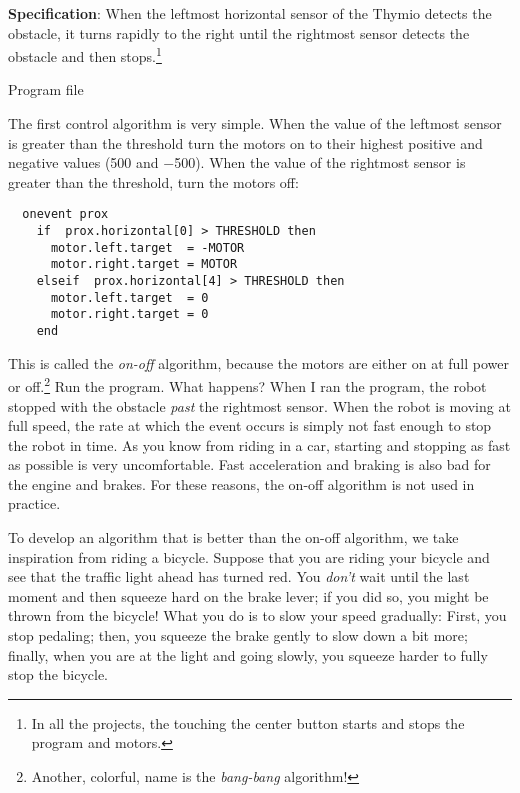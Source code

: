 
\textbf{Specification}: When the leftmost horizontal sensor of the
Thymio detects the obstacle, it turns rapidly to the right until the
rightmost sensor detects the obstacle and then stops.\footnote{In all
the projects, the touching the center button starts and stops the
program and motors.}

{\raggedleft \hfill Program file }

The first control algorithm is very simple. When the value of the
leftmost sensor is greater than the threshold turn the motors
on to their highest positive and negative values (500 and $-$500). When
the value of the rightmost sensor is greater than the threshold, turn
the motors off:

\begin{verbatim}
  onevent prox
    if  prox.horizontal[0] > THRESHOLD then
      motor.left.target  = -MOTOR 
      motor.right.target = MOTOR
    elseif  prox.horizontal[4] > THRESHOLD then
      motor.left.target  = 0
      motor.right.target = 0
    end
\end{verbatim}

This is called the \emph{on-off} algorithm, because the motors are
either on at full power or off.\footnote{Another, colorful, name is the
\emph{bang-bang} algorithm!} Run the program. What happens? When I ran
the program, the robot stopped with the obstacle \emph{past} the
rightmost sensor. When the robot is moving at full speed, the rate at
which the  event occurs is simply not fast enough to stop the
robot in time. As you know from riding in a car, starting and stopping
as fast as possible is very uncomfortable. Fast acceleration and braking
is also bad for the engine and brakes. For these reasons, the on-off
algorithm is not used in practice.


To develop an algorithm that is better than the on-off algorithm, we
take inspiration from riding a bicycle. Suppose that you are riding your
bicycle and see that the traffic light ahead has turned red. You
\emph{don't} wait until the last moment and then squeeze hard on the
brake lever; if you did so, you might be thrown from the bicycle! What
you do is to slow your speed gradually: First, you stop pedaling; then,
you squeeze the brake gently to slow down a bit more; finally, when you
are at the light and going slowly, you squeeze harder to fully stop the
bicycle.

